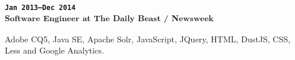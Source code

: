 \subsubsection{
\textsubscript{
\uppercase{\texttt{Jan 2013--Dec 2014}}\\
Software Engineer at The Daily Beast / Newsweek
}
}
Adobe CQ5, Java SE, Apache Solr, JavaScript, JQuery, HTML, DustJS, CSS, Less and 
Google Analytics.
